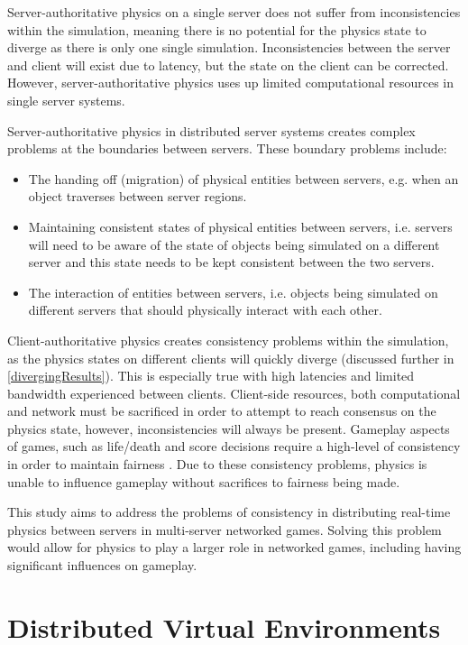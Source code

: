 Server-authoritative physics on a single server does not suffer from inconsistencies within the simulation, meaning there is no potential for the physics state to diverge as there is only one single simulation. Inconsistencies between the server and client will exist due to latency, but the state on the client can be corrected. However, server-authoritative physics uses up limited computational resources in single server systems.

Server-authoritative physics in distributed server systems creates complex problems at the boundaries between servers. These boundary problems include:
\begin{itemize}
\item The handing off (migration) of physical entities between servers, e.g. when an object traverses between server regions.
\item Maintaining consistent states of physical entities between servers, i.e. servers will need to be aware of the state of objects being simulated on a different server and this state needs to be kept consistent between the two servers. 
\item The interaction of entities between servers, i.e. objects being simulated on different servers that should physically interact with each other.
\end{itemize}

Client-authoritative physics creates consistency problems within the simulation, as the physics states on different clients will quickly diverge (discussed further in \ref{divergingResults}). This is especially true with high latencies and limited bandwidth experienced between clients. Client-side resources, both computational and network must be sacrificed in order to attempt to reach consensus on the physics state, however, inconsistencies will always be present. Gameplay aspects of games, such as life/death and score decisions require a high-level of consistency in order to maintain fairness \cite{savery2014consistency}. Due to these consistency problems, physics is unable to influence gameplay without sacrifices to fairness being made.

This study aims to address the problems of consistency in distributing real-time physics between servers in multi-server networked games. Solving this problem would allow for physics to play a larger role in networked games, including having significant influences on gameplay.

\section{Distributed Virtual Environments} \label{distrubted_virtual_env}

